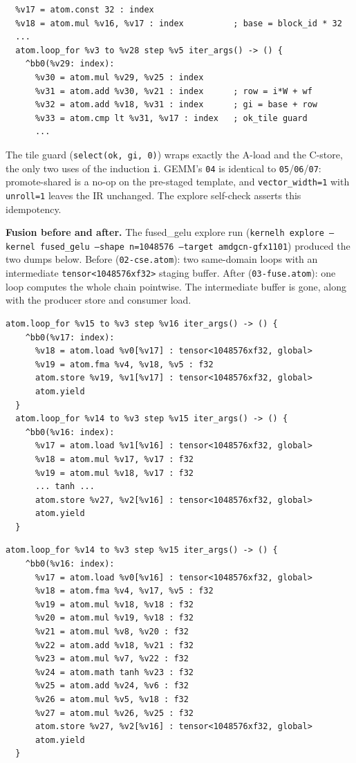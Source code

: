 \documentclass[10pt,twoside]{article}
\begin{document}
\begin{lstlisting}[caption={Tiled domain loop (\texttt{04-tile.atom}).},label={lst:tile}]
  %v16 = atom.block_id x : index
  %v17 = atom.const 32 : index
  %v18 = atom.mul %v16, %v17 : index          ; base = block_id * 32
  ...
  atom.loop_for %v3 to %v28 step %v5 iter_args() -> () {
    ^bb0(%v29: index):
      %v30 = atom.mul %v29, %v25 : index
      %v31 = atom.add %v30, %v21 : index      ; row = i*W + wf
      %v32 = atom.add %v18, %v31 : index      ; gi = base + row
      %v33 = atom.cmp lt %v31, %v17 : index   ; ok_tile guard
      ...
\end{lstlisting}

The tile guard (\texttt{select(ok, gi, 0)}) wraps exactly the A-load and the C-store, the only
two uses of the induction \texttt{i}. GEMM's \texttt{04} is identical to
\texttt{05}/\texttt{06}/\texttt{07}: promote-shared is a no-op on the pre-staged template, and
\texttt{vector\_width=1} with \texttt{unroll=1} leaves the IR unchanged. The explore
self-check asserts this idempotency.

\textbf{Fusion before and after.} The fused\_gelu explore run
(\texttt{kernelh explore --kernel fused\_gelu --shape n=1048576 --target amdgcn-gfx1101})
produced the two dumps below. Before (\texttt{02-cse.atom}): two same-domain loops with an
intermediate \texttt{tensor<1048576xf32>} staging buffer. After (\texttt{03-fuse.atom}): one
loop computes the whole chain pointwise. The intermediate buffer is gone, along with the
producer store and consumer load.

\begin{lstlisting}[caption={Fusion before (\texttt{02-cse.atom}): two loops + staging buffer.},
                   label={lst:fuse-before}]
  atom.loop_for %v15 to %v3 step %v16 iter_args() -> () {
    ^bb0(%v17: index):
      %v18 = atom.load %v0[%v17] : tensor<1048576xf32, global>
      %v19 = atom.fma %v4, %v18, %v5 : f32
      atom.store %v19, %v1[%v17] : tensor<1048576xf32, global>
      atom.yield
  }
  atom.loop_for %v14 to %v3 step %v15 iter_args() -> () {
    ^bb0(%v16: index):
      %v17 = atom.load %v1[%v16] : tensor<1048576xf32, global>
      %v18 = atom.mul %v17, %v17 : f32
      %v19 = atom.mul %v18, %v17 : f32
      ... tanh ...
      atom.store %v27, %v2[%v16] : tensor<1048576xf32, global>
      atom.yield
  }
\end{lstlisting}

\begin{lstlisting}[caption={Fusion after (\texttt{03-fuse.atom}): one loop, buffer gone.},
                   label={lst:fuse-after}]
  atom.loop_for %v14 to %v3 step %v15 iter_args() -> () {
    ^bb0(%v16: index):
      %v17 = atom.load %v0[%v16] : tensor<1048576xf32, global>
      %v18 = atom.fma %v4, %v17, %v5 : f32
      %v19 = atom.mul %v18, %v18 : f32
      %v20 = atom.mul %v19, %v18 : f32
      %v21 = atom.mul %v8, %v20 : f32
      %v22 = atom.add %v18, %v21 : f32
      %v23 = atom.mul %v7, %v22 : f32
      %v24 = atom.math tanh %v23 : f32
      %v25 = atom.add %v24, %v6 : f32
      %v26 = atom.mul %v5, %v18 : f32
      %v27 = atom.mul %v26, %v25 : f32
      atom.store %v27, %v2[%v16] : tensor<1048576xf32, global>
      atom.yield
  }
\end{lstlisting}
\end{document}
